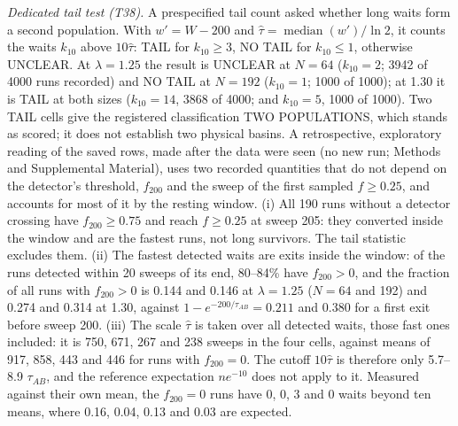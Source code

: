 \documentclass[aps,pre,10pt,twocolumn,superscriptaddress,nofootinbib]{revtex4-2}
\begin{document}
\emph{Dedicated tail test (T38).} A prespecified tail count asked whether long waits form a second
population. With $w'=W-200$ and $\widehat\tau=\operatorname{median}(w')/\ln2$, it counts the waits
$k_{10}$ above $10\widehat\tau$: TAIL for $k_{10}\ge3$, NO TAIL for $k_{10}\le1$, otherwise UNCLEAR.
At $\lambda=1.25$ the result is UNCLEAR at $N=64$ ($k_{10}=2$; 3942 of 4000 runs recorded) and NO
TAIL at $N=192$ ($k_{10}=1$; 1000 of 1000); at 1.30 it is TAIL at both sizes ($k_{10}=14$, 3868 of
4000; and $k_{10}=5$, 1000 of 1000).
Two TAIL cells give the registered classification TWO POPULATIONS, which stands as scored; it does
not establish two physical basins. A retrospective, exploratory reading of the saved rows, made
after the data were seen (no new run; Methods and Supplemental Material), uses two recorded
quantities that do not depend on the detector's threshold, $f_{200}$ and the sweep of the first
sampled $f\ge0.25$, and accounts for most of it by the resting window. (i) All 190 runs without a
detector crossing have $f_{200}\ge0.75$ and reach $f\ge0.25$ at sweep 205: they converted inside the
window and are the fastest runs, not long survivors. The tail statistic excludes them. (ii) The
fastest detected waits are exits inside the window: of the runs detected within 20 sweeps of its end,
80--84\% have $f_{200}>0$, and the fraction of all runs with $f_{200}>0$ is 0.144 and 0.146 at
$\lambda=1.25$ ($N=64$ and 192) and 0.274 and 0.314 at 1.30, against $1-e^{-200/\tau_{AB}}=0.211$ and
0.380 for a first exit before sweep 200. (iii) The scale $\widehat\tau$ is taken over all detected
waits, those fast ones included: it is 750, 671, 267 and 238 sweeps in the four cells, against means
of 917, 858, 443 and 446 for runs with $f_{200}=0$. The cutoff $10\widehat\tau$ is therefore only
5.7--8.9 $\tau_{AB}$, and the reference expectation $ne^{-10}$ does not apply to it. Measured against
their own mean, the $f_{200}=0$ runs have 0, 0, 3 and 0 waits beyond ten means, where 0.16, 0.04,
0.13 and 0.03 are expected.
\end{document}
